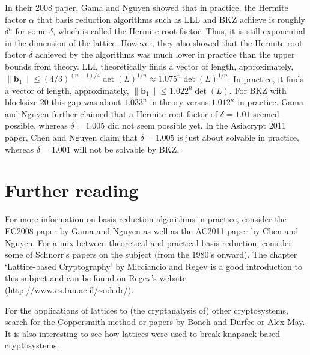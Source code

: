 \documentclass{article}[11pt]
\newcommand{\bfb}{\mathbf{b}}
\begin{document}
In their 2008 paper, Gama and Nguyen showed that in practice, the Hermite factor $\alpha$ that basis reduction algorithms such as LLL and BKZ achieve is roughly $\delta^n$ for some $\delta$, which is called the Hermite root factor. Thus, it is still exponential in the dimension of the lattice. However, they also showed that the Hermite root factor $\delta$ achieved by the algorithms was much lower in practice than the upper bounds from theory. LLL theoretically finds a vector of length, approximately, $\|\bfb_1\| \leq (4/3)^{(n-1)/4} \det(L)^{1/n} \approx 1.075^n \det(L)^{1/n}$. In practice, it finds a vector of length, approximately, $\|\bfb_1\| \leq 1.022^n\det(L)$. For BKZ with blocksize 20 this gap was about $1.033^n$ in theory versus $1.012^n$ in practice. Gama and Nguyen further claimed that a Hermite root factor of $\delta = 1.01$ seemed possible, whereas $\delta = 1.005$ did not seem possible yet. In the Asiacrypt 2011 paper, Chen and Nguyen claim that $\delta = 1.005$ is just about solvable in practice, whereas $\delta = 1.001$ will not be solvable by BKZ. 

\section*{Further reading}
For more information on basis reduction algorithms in practice, consider the EC2008 paper by Gama and Nguyen as well as the AC2011 paper by Chen and Nguyen. For a mix between theoretical and practical basis reduction, consider some of Schnorr's papers on the subject (from the 1980's onward). The chapter `Lattice-based Cryptography' by Micciancio and Regev is a good introduction to this subject and can be found on Regev's website (\url{http://www.cs.tau.ac.il/~odedr/}).

For the applications of lattices to (the cryptanalysis of) other cryptosystems, search for the Coppersmith method or papers by Boneh and Durfee or Alex May. It is also interesting to see how lattices were used to break knapsack-based cryptosystems.
\end{document}
